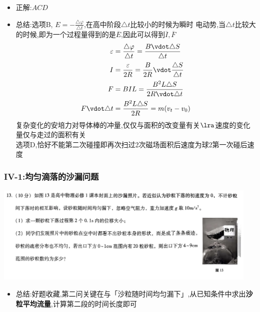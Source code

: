 \documentclass{article}
\begin{document}
\begin{itemize}
    \item 正解:\quad $ACD$
    \item 总结:\quad 选项B, $E = - \frac{\triangle \varphi}{\triangle t}$,在高中阶段$\triangle t$比较小的时候为瞬时
          电动势,当$\triangle t$比较大的时候,即为一个过程量得到的是$\overline{E}$,因此可以得到$\overline{I},\overline{F}$
          \begin{align*}
              \varepsilon         & = \frac{\triangle \varphi}{\triangle t} = \frac{B \vdot \triangle S}{\triangle t} \\
              I                   & = \frac{\varepsilon}{2R} = \frac{B}{2R} \vdot \frac{\triangle S}{\triangle t}  \\
              F                   & = B I L = \frac{B^{2}L \triangle S}{2R \vdot \triangle t}                      \\
              F \vdot \triangle t & = \frac{B^{2} L \triangle S}{2 R} = m(v_{t} - v_{0})
          \end{align*}
          复杂变化的安培力对导体棒的冲量,仅仅与面积的改变量有关$\lra$速度的变化量仅与走过的面积有关 \\
          选项D,恰好不能第二次碰撞即再次扫过2次磁场面积后速度为球2第一次碰后速度
\end{itemize}

\vspace{2em}

\subsubsection{IV-1:均匀滴落的沙漏问题}
\includegraphics[width=0.95\textwidth,keepaspectratio]{./pictures/3.1-4.png}

\begin{itemize}
    \item 总结:好题收藏,第二问关键在与「沙粒随时间均匀漏下」,从已知条件中求出\textbf{沙粒平均流量},计算第二段的时间长度即可
\end{itemize}
\end{document}
